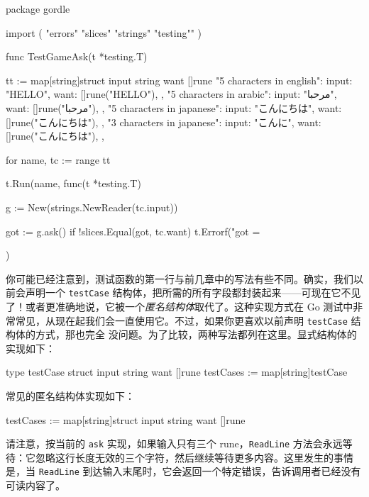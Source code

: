 \begin{gocode}[title={代码清单 5.11 \texttt{game\_internal\_test.go}}]
package gordle

import (
    "errors"
    "slices"
    "strings"
    "testing""
)

func TestGameAsk(t *testing.T) {
    tt := map[string]struct {
        input string
        want []rune
    }{
        "5 characters in english": {
            input: "HELLO",
            want: []rune("HELLO"),
        },
        "5 characters in arabic": {
            input: "مرحبا",
            want: []rune("مرحبا"),
        },
        "5 characters in japanese": {
            input: "こんにちは",
            want: []rune("こんにちは"),
        },
        "3 characters in japanese": {
            input: "こんに",
            want: []rune("こんにちは"),
        },
    }

    for name, tc := range tt {
        t.Run(name, func(t *testing.T) {
            g := New(strings.NewReader(tc.input))

            got := g.ask()
            if !slices.Equal(got, tc.want) {
                t.Errorf("got = %
            }
        })
    }
}
\end{gocode}

你可能已经注意到，测试函数的第一行与前几章中的写法有些不同。确实，我们以前会声明一个 \texttt{testCase} 结构体，把所需的所有字段都封装起来——可现在它不见了！或者更准确地说，它被一个\emph{匿名结构体}取代了。这种实现方式在 Go 测试中非常常见，从现在起我们会一直使用它。不过，如果你更喜欢以前声明 \texttt{testCase} 结构体的方式，那也完全
没问题。为了比较，两种写法都列在这里。显式结构体的实现如下：

\begin{gocode}[]
type testCase struct {
    input string
    want []rune
}
testCases := map[string]testCase
\end{gocode}

常见的匿名结构体实现如下：

\begin{gocode}[]
testCases := map[string]struct {
    input string
    want []rune
}
\end{gocode}

请注意，按当前的 \texttt{ask} 实现，如果输入只有三个 rune，\texttt{ReadLine} 方法会永远等待：它忽略这行长度无效的三个字符，然后继续等待更多内容。这里发生的事情是，当 \texttt{ReadLine} 到达输入末尾时，它会返回一个特定错误，告诉调用者已经没有可读内容了。

